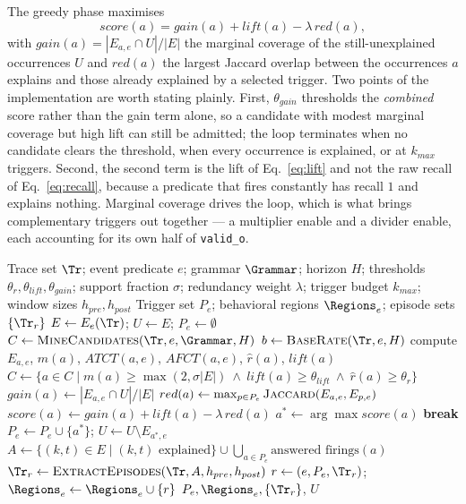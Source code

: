 The greedy phase maximises
\begin{equation}
score(a)=\mathit{gain}(a)+\mathit{lift}(a)-\lambda\,\mathit{red}(a),
\label{eq:score}
\end{equation}
with $\mathit{gain}(a)=|E_{a,e}\cap U|/|E|$ the marginal coverage of the still-unexplained
occurrences $U$ and $\mathit{red}(a)$ the largest Jaccard overlap between the occurrences $a$
explains and those already explained by a selected trigger. Two points of the implementation
are worth stating plainly. First, $\theta_{gain}$ thresholds the \emph{combined} score rather
than the gain term alone, so a candidate with modest marginal coverage but high lift can
still be admitted; the loop terminates when no candidate clears the threshold, when every
occurrence is explained, or at $k_{max}$ triggers. Second, the second term is the lift of
Eq.~\ref{eq:lift} and not the raw recall of Eq.~\ref{eq:recall}, because a predicate that
fires constantly has recall $1$ and explains nothing. Marginal coverage drives the loop, which is what
brings complementary triggers out together — a multiplier enable and a divider enable, each
accounting for its own half of \texttt{valid\_o}.

\begin{algorithm}[t]
\caption{Output-Guided Behavioral Decomposition}
\label{alg:decomp}
\scriptsize
\begin{algorithmic}[1]
\Require Trace set $\Tr$; event predicate $e$; grammar $\Grammar$; horizon $H$; thresholds $\theta_{r},\theta_{lift},\theta_{gain}$; support fraction $\sigma$; redundancy weight $\lambda$; trigger budget $k_{max}$; window sizes $h_{pre},h_{post}$
\Ensure Trigger set $P_e$; behavioral regions $\Regions_e$; episode sets $\{\Tr_r\}$
\State $E\gets E_e(\Tr)$; $U\gets E$; $P_e\gets\emptyset$ \Comment{\S\ref{sec:labeling}}
\State $C\gets\textsc{MineCandidates}(\Tr,e,\Grammar,H)$ \Comment{\S\ref{sec:candidates}}
\State $b\gets\textsc{BaseRate}(\Tr,e,H)$
  \State compute $E_{a,e}$, $m(a)$, $ATCT(a,e)$, $AFCT(a,e)$, $\hat{r}(a)$, $\mathit{lift}(a)$
\EndFor
\State $C\gets\{a\in C\mid m(a)\ge\max(2,\sigma|E|)\ \wedge\ \mathit{lift}(a)\ge\theta_{lift}\ \wedge\ \hat{r}(a)\ge\theta_{r}\}$ \label{alg:filter}
 \label{alg:greedy-start}
    \State $gain(a)\gets |E_{a,e}\cap U|/|E|$
    \State $red(a)\gets\max_{p\in P_e}\textsc{Jaccard}(E_{a,e},E_{p,e})$
    \State $score(a)\gets gain(a)+\mathit{lift}(a)-\lambda\,red(a)$
  \EndFor
  \State $a^*\gets\arg\max score(a)$
   \State \textbf{break} \EndIf
  \State $P_e\gets P_e\cup\{a^*\}$; $U\gets U\setminus E_{a^*,e}$
\EndWhile \label{alg:greedy-end}
\State $A\gets\{(k,t)\in E\mid (k,t)\text{ explained}\}\cup\bigcup_{a\in P_e}\text{answered firings}(a)$ \label{alg:anchors}
\State $\Tr_r\gets\textsc{ExtractEpisodes}(\Tr,A,h_{pre},h_{post})$
\State $r\gets(e,P_e,\Tr_r)$; $\Regions_e\gets\Regions_e\cup\{r\}$
\State \Return $P_e,\Regions_e,\{\Tr_r\}$, $U$ 
\end{algorithmic}
\end{algorithm}

